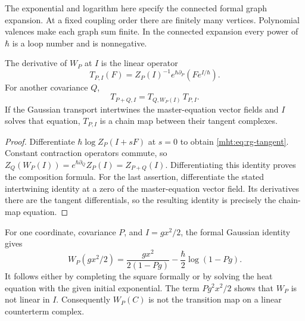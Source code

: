 The exponential and logarithm here specify the connected formal
graph expansion. At a fixed coupling order there are finitely many
vertices. Polynomial valences make each graph sum finite. In the
connected expansion every power of $\hbar$ is a loop number and
is nonnegative.

\begin{proposition}\label{mht:prop:rg-tangent-transport}
The derivative of $W_P$ at $I$ is the linear operator
\begin{equation}\label{mht:eq:rg-tangent}
 T_{P,I}(F)=Z_P(I)^{-1}e^{\hbar\partial_P}
                           (F e^{I/\hbar}).
\end{equation}
For another covariance $Q$,
\[
 T_{P+Q,I}=T_{Q,W_P(I)}\,T_{P,I}.
\]
If the Gaussian transport intertwines the master-equation vector
fields and $I$ solves that equation, $T_{P,I}$ is a chain map
between their tangent complexes.
\end{proposition}

\begin{proof}
Differentiate $\hbar\log Z_P(I+sF)$ at $s=0$ to obtain
\eqref{mht:eq:rg-tangent}. Constant contraction operators commute,
so
$Z_Q(W_P(I))=e^{\hbar\partial_Q}Z_P(I)=Z_{P+Q}(I)$.
Differentiating this identity proves the composition formula.
For the last assertion, differentiate the stated intertwining
identity at a zero of the master-equation vector field. Its
derivatives there are the tangent differentials, so the resulting
identity is precisely the chain-map equation.
\end{proof}

For one coordinate, covariance $P$, and $I=gx^2/2$, the formal
Gaussian identity gives
\[
 W_P(gx^2/2)
 =\frac{gx^2}{2(1-Pg)}-\frac{\hbar}{2}\log(1-Pg).
\]
It follows either by completing the square formally or by solving
the heat equation with the given initial exponential.
The term $Pg^2x^2/2$ shows that $W_P$ is not linear in $I$.
Consequently $W_P(C)$ is not the transition map on a linear
counterterm complex.


